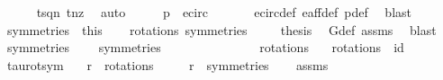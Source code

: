 \begin{isabellebody}
\ \ \ \ \isamarkupfalse%
\ t{\isacharunderscore}sq{\isacharunderscore}n{}\ t{\isacharunderscore}nz\ \isamarkupfalse%
\ auto\isanewline
\ \ \isamarkupfalse%
\ \isamarkupfalse%
\ {\isachardoublequoteopen}p\ {\isasymnotin}\ e{\isacharunderscore}circ{\isachardoublequoteclose}\ \isanewline
\ \ \ \ \isamarkupfalse%
\ e{\isacharunderscore}circ{\isacharunderscore}def\ e{\isacharunderscore}aff{\isacharunderscore}def\ p{\isacharunderscore}def\ \isamarkupfalse%
\ blast\isacommand{{\isacharbraceright}}\isamarkupfalse%
\isanewline
\ \ \isamarkupfalse%
\ symmetries\ {\isacharequal}\ this\isanewline
\ \ \isamarkupfalse%
\ rotations\ symmetries\ \isanewline
\ \ \isamarkupfalse%
\ {\isacharquery}thesis\ \isamarkupfalse%
\ G{\isacharunderscore}def\ assms{\isacharparenleft}{}{\isacharcomma}{}{\isacharparenright}\ \isamarkupfalse%
\ blast\isanewline
{}\isamarkupfalse%
%
\endisatagproof
{\isafoldproof}%
%
\isadelimproof
\isanewline
%
\endisadelimproof
\isanewline
{}\isamarkupfalse%
\ symmetries\ \ \isanewline
\ \ {\isachardoublequoteopen}symmetries\ {\isacharequal}\ {\isacharbraceleft}{\isasymtau}{\isacharcomma}{\isasymtau}\ {\isasymcirc}\ {\isasymrho}{\isacharcomma}{\isasymtau}\ {\isasymcirc}\ {\isasymrho}\ {\isasymcirc}\ {\isasymrho}{\isacharcomma}{\isasymtau}\ {\isasymcirc}\ {\isasymrho}\ {\isasymcirc}\ {\isasymrho}\ {\isasymcirc}\ {\isasymrho}{\isacharbraceright}{\isachardoublequoteclose}\isanewline
\isanewline
{}\isamarkupfalse%
\ rotations\ \isanewline
\ \ {\isachardoublequoteopen}rotations\ {\isacharequal}\ {\isacharbraceleft}id{\isacharcomma}{\isasymrho}{\isacharcomma}{\isasymrho}\ {\isasymcirc}\ {\isasymrho}{\isacharcomma}{\isasymrho}\ {\isasymcirc}\ {\isasymrho}\ {\isasymcirc}\ {\isasymrho}{\isacharbraceright}{\isachardoublequoteclose}\isanewline
\isanewline
{}\isamarkupfalse%
\ tau{\isacharunderscore}rot{\isacharunderscore}sym{\isacharcolon}\isanewline
\ \ \ {\isachardoublequoteopen}r\ {\isasymin}\ rotations{\isachardoublequoteclose}\isanewline
\ \ \ {\isachardoublequoteopen}{\isasymtau}\ {\isasymcirc}\ r\ {\isasymin}\ symmetries{\isachardoublequoteclose}\isanewline
%
\isadelimproof
\ \ %
\endisadelimproof
%
\isatagproof
{}\isamarkupfalse%
\ assms\ \isamarkupfalse%

\end{isabellebody}
